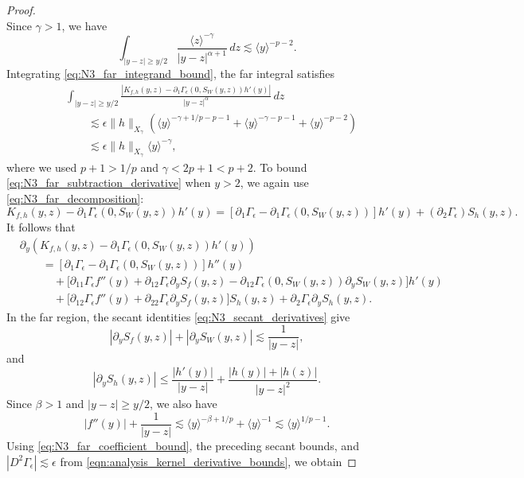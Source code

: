 \documentclass[11pt]{amsart}
\theoremstyle{definition}
\theoremstyle{remark}
\numberwithin{equation}{section}
\newcommand{\ang}[1]{\langle #1 \rangle}
\begin{document}
\begin{proof}
\begin{equation}
\end{equation}
Since $\gamma>1$, we have
\[
    \int_{|y-z|\geq y/2}\frac{\ang{z}^{-\gamma}}{|y-z|^{\alpha+1}}\,dz
    \lesssim\ang{y}^{-p-2}.
\]
Integrating \eqref{eq:N3_far_integrand_bound}, the far integral satisfies
\begin{equation}\label{eq:N3_far_plus_value}
\begin{aligned}
    &\int_{|y-z|\geq y/2}
    \frac{|K_{f,h}(y,z)-\partial_1\Gamma_\epsilon(0,S_W(y,z))h'(y)|}{|y-z|^\alpha}\,dz\\
    &\qquad\lesssim\epsilon\|h\|_{X_\gamma}
    \left(\ang{y}^{-\gamma+1/p-p-1}
    +\ang{y}^{-\gamma-p-1}+\ang{y}^{-p-2}\right)\\
    &\qquad\lesssim\epsilon\|h\|_{X_\gamma}\ang{y}^{-\gamma},
\end{aligned}
\end{equation}
where we used $p+1>1/p$ and $\gamma<2p+1<p+2$. To bound \eqref{eq:N3_far_subtraction_derivative} when $y > 2$, we again use \eqref{eq:N3_far_decomposition}: 
\[
    K_{f,h}(y,z)-\partial_1\Gamma_\epsilon(0,S_W(y,z))h'(y)
    =[\partial_1\Gamma_\epsilon-\partial_1\Gamma_\epsilon(0,S_W(y,z))]h'(y)
    +(\partial_2\Gamma_\epsilon)S_h(y,z).
\]
It follows that
\begin{align*}
    &\partial_y\left(K_{f,h}(y,z)-\partial_1\Gamma_\epsilon(0,S_W(y,z))h'(y)\right)\\
    &\qquad=[\partial_1\Gamma_\epsilon-\partial_1\Gamma_\epsilon(0,S_W(y,z))]h''(y)\\
    &\qquad\quad+\bigl[\partial_{11}\Gamma_\epsilon f''(y)
    +\partial_{12}\Gamma_\epsilon\partial_yS_f(y,z)
    -\partial_{12}\Gamma_\epsilon(0,S_W(y,z))\partial_yS_W(y,z)\bigr]h'(y)\\
    &\qquad\quad+\bigl[\partial_{12}\Gamma_\epsilon f''(y)
    +\partial_{22}\Gamma_\epsilon\partial_yS_f(y,z)\bigr]S_h(y,z)
    +\partial_2\Gamma_\epsilon\partial_yS_h(y,z).
\end{align*}
In the far region, the secant identities \eqref{eq:N3_secant_derivatives} give
\[
    |\partial_yS_f(y,z)|+|\partial_yS_W(y,z)|\lesssim\frac{1}{|y-z|},
\]
and
\[
    |\partial_yS_h(y,z)|
    \leq\frac{|h'(y)|}{|y-z|}
    +\frac{|h(y)|+|h(z)|}{|y-z|^2}.
\]
Since $\beta>1$ and $|y-z|\geq y/2$, we also have
\[
    |f''(y)|+\frac{1}{|y-z|}
    \lesssim\ang{y}^{-\beta+1/p}+\ang{y}^{-1}
    \lesssim\ang{y}^{1/p-1}.
\]
Using \eqref{eq:N3_far_coefficient_bound}, the preceding secant bounds, and $|D^2\Gamma_\epsilon|\lesssim\epsilon$
from \eqref{eqn:analysis_kernel_derivative_bounds}, we obtain

\end{proof}
\end{document}
